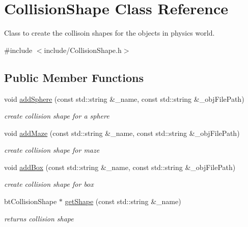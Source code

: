 \hypertarget{classCollisionShape}{
\section{CollisionShape Class Reference}
\label{classCollisionShape}
}


Class to create the collisoin shapes for the objects in physics world.  


{\ttfamily \#include $<$include/CollisionShape.h$>$}\subsection*{Public Member Functions}
\begin{DoxyCompactItemize}
\item 
void \hyperlink{classCollisionShape_aae7739c3bf1be44f3f8722cfe76bc8cc}{addSphere} (const std::string \&\_\-name, const std::string \&\_\-objFilePath)
\begin{DoxyCompactList}\small\item\em create collision shape for a sphere \item\end{DoxyCompactList}\item 
void \hyperlink{classCollisionShape_a61c367ab49609cb28636080853dd0a2c}{addMaze} (const std::string \&\_\-name, const std::string \&\_\-objFilePath)
\begin{DoxyCompactList}\small\item\em create collision shape for maze \item\end{DoxyCompactList}\item 
void \hyperlink{classCollisionShape_ad1f816e259bf91027c8e775f89ed76a4}{addBox} (const std::string \&\_\-name, const std::string \&\_\-objFilePath)
\begin{DoxyCompactList}\small\item\em create collision shape for box \item\end{DoxyCompactList}\item 
btCollisionShape $\ast$ \hyperlink{classCollisionShape_ac2fc5b4b07d9b6f6551d1e021e65626e}{getShape} (const std::string \&\_\-name)
\begin{DoxyCompactList}\small\item\em returns collision shape \item\end{DoxyCompactList}\end{DoxyCompactItemize}
